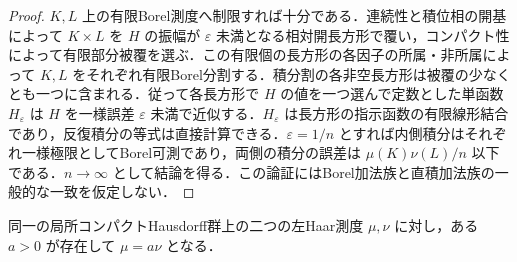 \begin{proof}
$K,L$ 上の有限Borel測度へ制限すれば十分である．連続性と積位相の開基によって $K\times L$ を $H$ の振幅が $\varepsilon$ 未満となる相対開長方形で覆い，コンパクト性によって有限部分被覆を選ぶ．この有限個の長方形の各因子の所属・非所属によって $K,L$ をそれぞれ有限Borel分割する．積分割の各非空長方形は被覆の少なくとも一つに含まれる．従って各長方形で $H$ の値を一つ選んで定数とした単函数 $H_\varepsilon$ は $H$ を一様誤差 $\varepsilon$ 未満で近似する．$H_\varepsilon$ は長方形の指示函数の有限線形結合であり，反復積分の等式は直接計算できる．$\varepsilon=1/n$ とすれば内側積分はそれぞれ一様極限としてBorel可測であり，両側の積分の誤差は $\mu(K)\nu(L)/n$ 以下である．$n\to\infty$ として結論を得る．この論証にはBorel加法族と直積加法族の一般的な一致を仮定しない．
\end{proof}
\begin{prop}[Haar測度の一意性]
同一の局所コンパクトHausdorff群上の二つの左Haar測度 $\mu,\nu$ に対し，ある $a>0$ が存在して $\mu=a\nu$ となる．
\end{prop}

